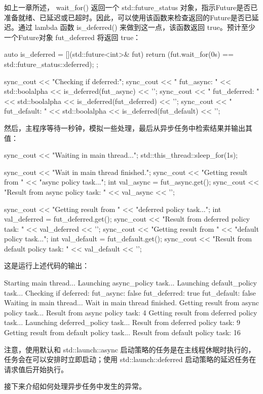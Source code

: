 如上一章所述， wait\_for() 返回一个 std::future\_status 对象，指示Future是否已准备就绪、已延迟或已超时。因此，可以使用该函数来检查返回的Future是否已延迟。通过 lambda 函数 is\_deferred() 来做到这一点，该函数返回 true。预计至少一个Future对象 fut\_deferred 将返回 true：

\begin{cpp}
auto is_deferred = [](std::future<int>& fut) {
    return (fut.wait_for(0s) ==
    std::future_status::deferred);
};

sync_cout << "Checking if deferred:\n";
sync_cout << " fut_async: " << std::boolalpha
          << is_deferred(fut_async) << '\n';
sync_cout << " fut_deferred: " << std::boolalpha
          << is_deferred(fut_deferred) << '\n';
sync_cout << " fut_default: " << std::boolalpha
          << is_deferred(fut_default) << '\n';
\end{cpp}

然后，主程序等待一秒钟，模拟一些处理，最后从异步任务中检索结果并输出其值：

\begin{cpp}
sync_cout << "Waiting in main thread...\n";
std::this_thread::sleep_for(1s);

sync_cout << "Wait in main thread finished.\n";
sync_cout << "Getting result from "
          << "async policy task...\n";
int val_async = fut_async.get();
sync_cout << "Result from async policy task: "
          << val_async << '\n';

sync_cout << "Getting result from "
          << "deferred policy task...\n";
int val_deferred = fut_deferred.get();
sync_cout << "Result from deferred policy task: "
          << val_deferred << '\n';
sync_cout << "Getting result from "
          << "default policy task...\n";
int val_default = fut_default.get();
sync_cout << "Result from default policy task: "
          << val_default << '\n';
\end{cpp}

这是运行上述代码的输出：

\begin{shell}
Starting main thread...
Launching async_policy task...
Launching default_policy task...
Checking if deferred:
  fut_async: false
  fut_deferred: true
  fut_default: false
Waiting in main thread...
Wait in main thread finished.
Getting result from async policy task...
Result from async policy task: 4
Getting result from deferred policy task...
Launching deferred_policy task...
Result from deferred policy task: 9
Getting result from default policy task...
Result from default policy task: 16
\end{shell}

注意，使用默认和 std::launch::async 启动策略的任务是在主线程休眠时执行的，任务会在可以安排时立即启动；使用 std::launch::deferred 启动策略的延迟任务在请求值后开始执行。

接下来介绍如何处理异步任务中发生的异常。
